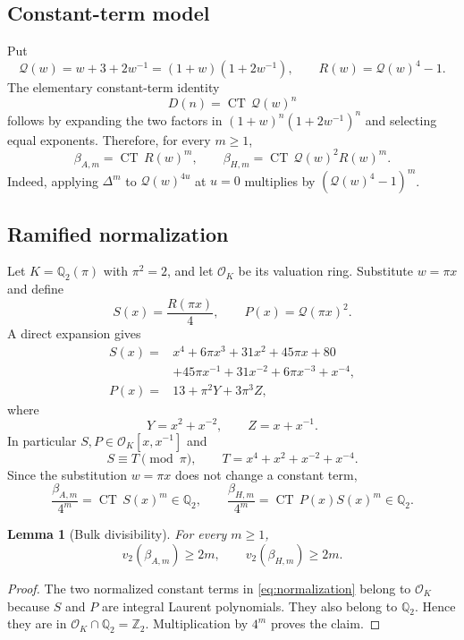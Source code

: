 \documentclass[11pt]{article}
\newtheorem{lemma}[theorem]{Lemma}
\theoremstyle{remark}\newtheorem{remark}[theorem]{Remark}
\newcommand{\CT}{\operatorname{CT}}
\newcommand{\Z}{\mathbb Z}\newcommand{\Q}{\mathbb Q}
\newcommand{\cO}{\mathcal O}\newcommand{\vp}{v_2}
\begin{document}
\subsection{Constant-term model}

Put
\[
\mathcal Q(w)=w+3+2w^{-1}=(1+w)(1+2w^{-1}),
\qquad R(w)=\mathcal Q(w)^4-1.
\]
The elementary constant-term identity
\[
D(n)=\CT\,\mathcal Q(w)^n
\]
follows by expanding the two factors in $(1+w)^n(1+2w^{-1})^n$ and
selecting equal exponents.  Therefore, for every $m\ge1$,
\begin{equation}\label{eq:beta-ct}
\beta_{A,m}=\CT\,R(w)^m,
\qquad
\beta_{H,m}=\CT\,\mathcal Q(w)^2R(w)^m.
\end{equation}
Indeed, applying $\Delta^m$ to $\mathcal Q(w)^{4u}$ at $u=0$ multiplies by
$(\mathcal Q(w)^4-1)^m$.

\subsection{Ramified normalization}

Let $K=\Q_2(\pi)$ with $\pi^2=2$, and let $\cO_K$ be its valuation ring.
Substitute $w=\pi x$ and define
\[
S(x)=\frac{R(\pi x)}4,
\qquad
P(x)=\mathcal Q(\pi x)^2.
\]
A direct expansion gives
\begin{align*}
S(x)={}&x^4+6\pi x^3+31x^2+45\pi x+80\\
&+45\pi x^{-1}+31x^{-2}+6\pi x^{-3}+x^{-4},\\
P(x)={}&13+\pi^2Y+3\pi^3Z,
\end{align*}
where
\[
Y=x^2+x^{-2},\qquad Z=x+x^{-1}.
\]
In particular $S,P\in\cO_K[x,x^{-1}]$ and
\[
S\equiv T\pmod\pi,
\qquad
T=x^4+x^2+x^{-2}+x^{-4}.
\]
Since the substitution $w=\pi x$ does not change a constant term,
\begin{equation}\label{eq:normalization}
\frac{\beta_{A,m}}{4^m}=\CT\,S(x)^m\in\Q_2,
\qquad
\frac{\beta_{H,m}}{4^m}=\CT\,P(x)S(x)^m\in\Q_2.
\end{equation}

\begin{lemma}[Bulk divisibility]\label{lem:bulk}
For every $m\ge1$,
\[
\vp(\beta_{A,m})\ge2m,
\qquad
\vp(\beta_{H,m})\ge2m.
\]
\end{lemma}

\begin{proof}
The two normalized constant terms in \eqref{eq:normalization} belong to
$\cO_K$ because $S$ and $P$ are integral Laurent polynomials.  They also
belong to $\Q_2$.  Hence they are in $\cO_K\cap\Q_2=\Z_2$.  Multiplication
by $4^m$ proves the claim.
\end{proof}
\end{document}
